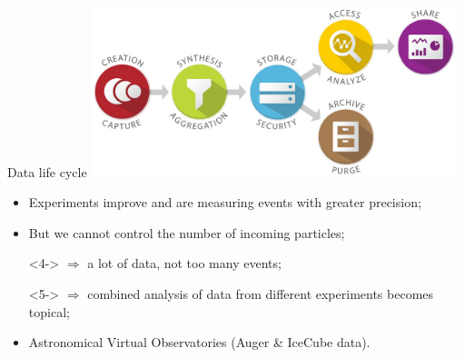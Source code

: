 \begin{frame}{Data life cycle}%
\vspace{-1ex}
\centering
\includegraphics[width=0.8\textwidth]{pics/data_lifecycle_illust.jpg}
\vspace{-1ex}
\begin{itemize}
\setlength{\itemsep}{0pt}
\item<2-> Experiments improve and are measuring events with greater precision;
\item<3-> But we cannot control the number of incoming particles;
\item[]<4-> $\Rightarrow$ a lot of data, not too many events;
\item[]<5-> $\Rightarrow$ combined analysis of data from different experiments becomes topical;
\item<6-> Astronomical Virtual Observatories (Auger \& IceCube data).
\end{itemize}

\end{frame}

% 

